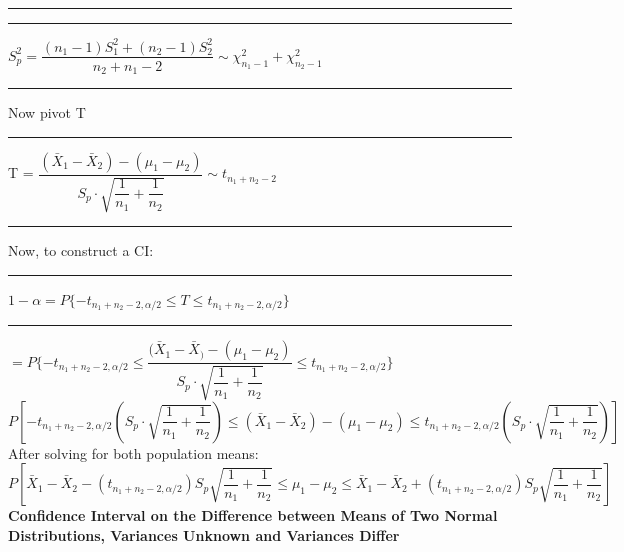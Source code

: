 \documentclass[]{article}
\begin{document}
\newline\Large\rule{3.0cm}{0pt} 
\newline\Large\rule{3.0cm}{0pt} $S^2_p = \dfrac{(n_1 -1)S^2_1 + (n_2 - 1) S^2_2}{n_2 + n_1- 2} \sim \chi^2_{n_1 -1} + \chi^2_{n_2 -1}$ 
\newline\newline\Large\rule{3.0cm}{0pt} Now pivot T
\newline\newline\Large\rule{3.0cm}{0pt} T = $\dfrac{  (  \bar{X}_1 - \bar{X}_2 )  -  (\mu_1 - \mu_2)   }{S_p \cdot \sqrt{\dfrac{1}{n_1} + \dfrac{1}{n_2} }} \sim t_{n_1 + n_2 - 2}$
\newline
\newline\newline\Large\rule{3.0cm}{0pt}  Now, to construct a CI:
\newline
\newline\Large\rule{3.0cm}{0pt} $1 - \alpha = P \{ -t_{n_1 + n_2 - 2, \alpha / 2} \le T \le t_{n_1 + n_2 - 2, \alpha /2} \}$ 
\newline
\newline
\newline\Large\rule{2.3cm}{0pt} $ = P \{ -t_{n_1 + n_2 - 2, \alpha / 2} \le \dfrac{ ( \bar{X}_1 - \bar{X}_  ) - (\mu_1 - \mu_2)   }{S_p \cdot \sqrt{\dfrac{1}{n_1} + \dfrac{1}{n_2} }} \le t_{n_1 + n_2 - 2, \alpha /2} \}$
\newline
\newline
\newline
$P \left[  -t_{n_1 + n_2 - 2, \alpha / 2} \left( S_p \cdot \sqrt{\dfrac{1}{n_1} + \dfrac{1}{n_2}} \right) \le  (  \bar{X}_1 - \bar{X}_2 )  -  (\mu_1 - \mu_2) \le t_{n_1 + n_2 - 2, \alpha /2} \left( S_p \cdot \sqrt{\dfrac{1}{n_1} + \dfrac{1}{n_2}} \right)  \right]$
\newline
\newline
\newline After solving for both population means:
\newline
\newline$P\left[  \bar{X}_1 - \bar{X}_2 - ( t_{n_1 + n_2 - 2, \alpha / 2} ) S_p \sqrt{\dfrac{1}{n_1} + \dfrac{1}{n_2}}  \le  \mu_1 - \mu_2 \le  \bar{X}_1 - \bar{X}_2  +  (t_{n_1 + n_2 - 2, \alpha /2}) S_p \sqrt{\dfrac{1}{n_1} + \dfrac{1}{n_2}} \right]$
\newline
\newline\newline\newline
\newline
\Large\textbf{Confidence Interval on the Difference between Means of Two Normal Distributions, Variances Unknown and Variances Differ}
\end{document}
